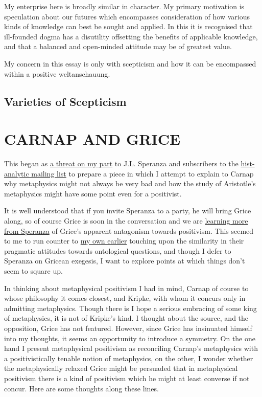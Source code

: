 \documentclass{rbjk}
\begin{document}
\begin{article}
My enterprise here is broadly similar in character.
My primary motivation is speculation about our futures which encompasses consideration of how various kinds of knowledge can best be sought and applied.
In this it is recognised that ill-founded dogma has a disutility offsetting the benefits of applicable knowledge, and that a balanced and open-minded attitude may be of greatest value.

My concern in this essay is only with scepticism and how it can be encompassed within a positive weltanschauung.

\subsection{Varieties of Scepticism}

\section{CARNAP AND GRICE}

This began as \href{http://rbjones.com/pipermail/hist-analytic_rbjones.com/2009q2/000267.html}{a threat on my part} to J.L. Speranza and subscribers to the \href{http://www.hist-analytic.org/}{hist-analytic mailing list} to prepare a piece in which I attempt to explain to Carnap why metaphysics might not always be very bad and how the study of Aristotle's metaphysics might have some point even for a positivist.

It is well understood that if you invite Speranza to a party, he will bring Grice along, so of course Grice is soon in the conversation and we are \href{http://rbjones.com/pipermail/hist-analytic_rbjones.com/2009q2/000268.html}{learning more from Speranza} of Grice's apparent antagonism towards positivism.
This seemed to me to run counter to \href{http://rbjones.com/pipermail/hist-analytic_rbjones.com/2009q2/000254.html}{my own earlier} touching upon the similarity in their pragmatic attitudes towards ontological questions, and though I defer to Speranza on Gricean exegesis, I want to explore points at which things don't seem to square up.

In thinking about metaphysical positivism I had in mind, Carnap of course to whose philosophy it comes closest, and Kripke, with whom it concurs only in admitting metaphysics.
Though there is I hope a serious embracing of some king of metaphysics, it is not of Kripke's kind.
I thought about the source, and the opposition, Grice has not featured.
However, since Grice has insinuated himself into my thoughts, it seems an opportunity to introduce a symmetry.
On the one hand I present metaphysical positivism as reconciling Carnap's metaphysics with a positivistically tenable notion of metaphysics, on the other, I wonder whether the metaphysically relaxed Grice might be persuaded that in metaphysical positivism there is a kind of positivism which he might at least converse if not concur. 
Here are some thoughts along these lines.


\end{article}
\end{document}
